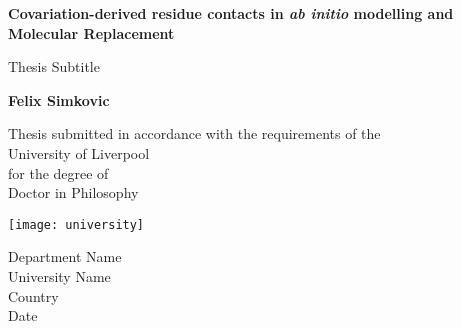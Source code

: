 \begin{titlepage}
    \begin{center}
        \vspace*{1cm}
        
        \Huge
        \textbf{Covariation-derived residue contacts in \textit{ab initio} modelling and Molecular Replacement}
        
        \vspace{0.5cm}
        \LARGE
        Thesis Subtitle
        
        \vspace{1.5cm}
        
        \textbf{Felix Simkovic}
        
        \vfill
        
        Thesis submitted in accordance with the requirements of the \\
        University of Liverpool\\
        for the degree of\\
        Doctor in Philosophy
        
        \vspace{0.8cm}
        
        \texttt{[image: university]}
        
        \Large
        Department Name\\
        University Name\\
        Country\\
        Date
        
    \end{center}
\end{titlepage}
